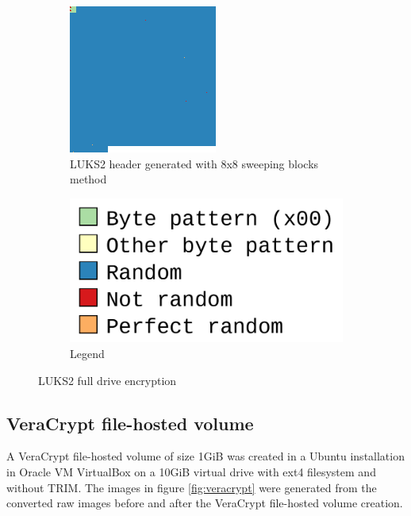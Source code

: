 \documentclass[
  digital, %
  color,   %
  oneside, %
  lof,     %
  nolot,     %
]{fithesis4}
\begin{document}
\begin{figure}
\begin{subfigure}[t]{.45\textwidth}
    \includegraphics[width=\textwidth,interpolate=false]{ext4-luks2-head.png}
    \caption{LUKS2 header generated with 8x8 sweeping blocks method}
    \label{fig:luks-full}
  \end{subfigure}
  \begin{subfigure}[b]{.45\textwidth}
    \centering
    \includegraphics[width=\textwidth]{legend.png}
    \caption{Legend}
    \label{fig:luks-legend} 
  \end{subfigure}
  \caption{LUKS2 full drive encryption}
  \label{fig:luks-header}
\end{figure}

\subsection{VeraCrypt file-hosted volume}
\label{ssec:veracrypt-file-hosted-volume}
A VeraCrypt file-hosted volume of size 1GiB was created in a Ubuntu installation in Oracle VM VirtualBox on a 10GiB virtual drive with ext4 filesystem and without TRIM.
The images in figure \ref{fig:veracrypt} were generated from the converted raw images before and after the VeraCrypt file-hosted volume\cite{veracryptvol} creation.
\end{document}
